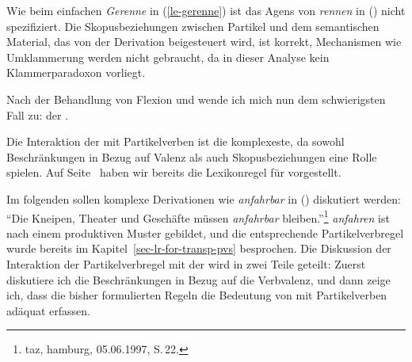 \noindent
Wie beim einfachen \emph{Gerenne} in (\ref{le-gerenne}) ist das
Agens von \emph{rennen} in () nicht spezifiziert. 
Die Skopusbeziehungen zwischen Partikel und dem semantischen Material,
das von der Derivation beigesteuert wird, ist korrekt, Mechanismen
wie Umklammerung werden nicht gebraucht, da in dieser Analyse kein
Klammerparadoxon vorliegt.

\begin{comment}
The derivation with object predicatives and resultatives is completely analogous:
The rule in (\ref{lr-gee-nom}) is applied to the lexical entry for the object predicative
\emph{find}- (`find') producing \stem{gefinde}, which is then combined with 
\emph{schön} (`beautiful') to yield \emph{Schöngefinde}\iw{Schöngefinde} (`beautiful.finding').
In the case of resultative constructions, the listed entry for \emph{schlag}- (`to hit')
is fed into the lexical rule (\ref{lr-result}) for resultative constructions.
The output of this rule is the input to (\ref{lr-gee-nom}), yielding
\stem{geschlage}, which is then combined with \emph{tot} (`dead'),
resulting in \word{Totgeschlage} (`dead.beating').
\end{comment}

Nach der Behandlung von Flexion und \geen wende ich mich nun
dem schwierigsten Fall zu: der \bard.

\label{sec-bard-pv}

Die\iw{\bars|(}%
Interaktion der \bard mit Partikelverben ist die
komplexeste, da sowohl Beschränkungen in Bezug auf Valenz
als auch Skopusbeziehungen eine Rolle spielen.
Auf Seite~\pageref{lr-bar-adj} haben wir bereits die
Lexikonregel  für \bard vorgestellt.

Im folgenden sollen komplexe Derivationen wie \emph{anfahrbar}
in () diskutiert werden:
\ea
 "`Die Kneipen,        Theater  und Geschäfte müssen \emph{anfahrbar} bleiben."'\footnote{
taz, hamburg, 05.06.1997, S.\,22.%
}
\z
\emph{anfahren} ist nach einem produktiven Muster gebildet, und die entsprechende
Partikelverbregel wurde bereits im Kapitel~\ref{sec-lr-for-transp-pvs} besprochen.
Die Diskussion der Interaktion der Partikelverbregel mit der \bard wird in zwei Teile geteilt: Zuerst
diskutiere ich die Beschränkungen in Bezug auf die Verbvalenz, und dann zeige ich,
dass die bisher formulierten Regeln die Bedeutung von \barden mit Partikelverben adäquat
erfassen.

